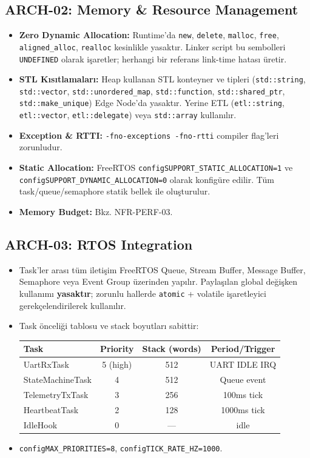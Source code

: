 \subsection{ARCH-02: Memory \& Resource Management}
\begin{itemize}
    \item \textbf{Zero Dynamic Allocation:} Runtime'da \texttt{new}, \texttt{delete}, \texttt{malloc}, \texttt{free}, \texttt{aligned\_alloc}, \texttt{realloc} kesinlikle yasaktır. Linker script bu sembolleri \texttt{UNDEFINED} olarak işaretler; herhangi bir referans link-time hatası üretir.
    \item \textbf{STL Kısıtlamaları:} Heap kullanan STL konteyner ve tipleri (\texttt{std::string}, \texttt{std::vector}, \texttt{std::unordered\_map}, \texttt{std::function}, \texttt{std::shared\_ptr}, \texttt{std::make\_unique}) Edge Node'da yasaktır. Yerine ETL (\texttt{etl::string}, \texttt{etl::vector}, \texttt{etl::delegate}) veya \texttt{std::array} kullanılır.
    \item \textbf{Exception \& RTTI:} \texttt{-fno-exceptions -fno-rtti} compiler flag'leri zorunludur.
    \item \textbf{Static Allocation:} FreeRTOS \texttt{configSUPPORT\_STATIC\_ALLOCATION=1} ve \texttt{configSUPPORT\_DYNAMIC\_ALLOCATION=0} olarak konfigüre edilir. Tüm task/queue/semaphore statik bellek ile oluşturulur.
    \item \textbf{Memory Budget:} Bkz. NFR-PERF-03.
\end{itemize}

\subsection{ARCH-03: RTOS Integration}
\begin{itemize}
    \item Task'ler arası tüm iletişim FreeRTOS Queue, Stream Buffer, Message Buffer, Semaphore veya Event Group üzerinden yapılır. Paylaşılan global değişken kullanımı \textbf{yasaktır}; zorunlu hallerde \texttt{atomic} + volatile işaretleyici gerekçelendirilerek kullanılır.
    \item Task önceliği tablosu ve stack boyutları sabittir:
    \begin{center}
    \begin{tabular}{|l|c|c|c|}
    \hline
    \textbf{Task} & \textbf{Priority} & \textbf{Stack (words)} & \textbf{Period/Trigger} \\
    \hline
    UartRxTask     & 5 (high)   & 512 & UART IDLE IRQ \\
    StateMachineTask & 4        & 512 & Queue event \\
    TelemetryTxTask & 3         & 256 & 100ms tick \\
    HeartbeatTask  & 2          & 128 & 1000ms tick \\
    IdleHook       & 0          & —   & idle \\
    \hline
    \end{tabular}
    \end{center}
    \item \texttt{configMAX\_PRIORITIES=8}, \texttt{configTICK\_RATE\_HZ=1000}.
\end{itemize}

